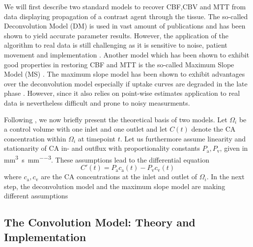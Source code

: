 \documentclass[paper=a4, fontsize=11pt,parskip=half,headings=small]{scrartcl}
\newcommand{\ca}{c_\mathrm{a}}
\newcommand{\cout}{c_{\mathrm{v}}}
\newcommand{\Pa}{P_{\mathrm{a}}}
\newcommand{\Pout}{P_{\mathrm{v}}}
\newcommand{\siP}{\cubic\milli\meter\per\second\per\cubic\milli\meter}
\begin{document}
	We will first describe two standard models to recover CBF,CBV and MTT from data displaying propagation of a contrast agent through the tissue.
	The so-called Deconvolution Model (DM) is used in vast amount of publications \cite{ostergaard96,abels10,straka10,bivard13,sourbron13} and has been shown to yield accurate parameter results.
	However, the application of the algorithm to real data is still challenging as it is sensitive to noise, patient movement and implementation \cite{kudo10}.
	Another model which has been shown to exhibit good properties in restoring CBF and MTT is the so-called Maximum Slope Model (MS) \cite{miles91,klotz99}.
	The maximum slope model has been shown to exhibit advantages over the deconvolution model especially if uptake curves are degraded in the late phase \cite{abels10}.
	However, since it also relies on point-wise estimates application to real data is nevertheless difficult and prone to noisy measurments.
		
	Following \cite{sourbron13}, we now briefly present the theoretical basis of two models.
	Let $\Omega_i$ be a control volume with one inlet and one outlet and let $C(t)$ denote the CA concentration within $\Omega_i$ at timepoint $t$.
	Let us furthermore assume linearity and stationarity of CA in- and outflux with proportionality constants $\Pa,\Pout$, given in \si{\siP}.
	These assumptions lead to the differential equation 
	\begin{equation}
		C'(t) = \Pa\ca(t) - \Pout\cout(t)
		\label{eq:classicgeneral}
	\end{equation}
	where $\ca,\cout$ are the CA concentrations at the inlet and outlet of $\Omega_i$. 	
	In the next step, the deconvolution model and the maximum slope model are making different assumptions

	\subsection{The Convolution Model: Theory and Implementation}\label{sec:conv}
	
\end{document}
